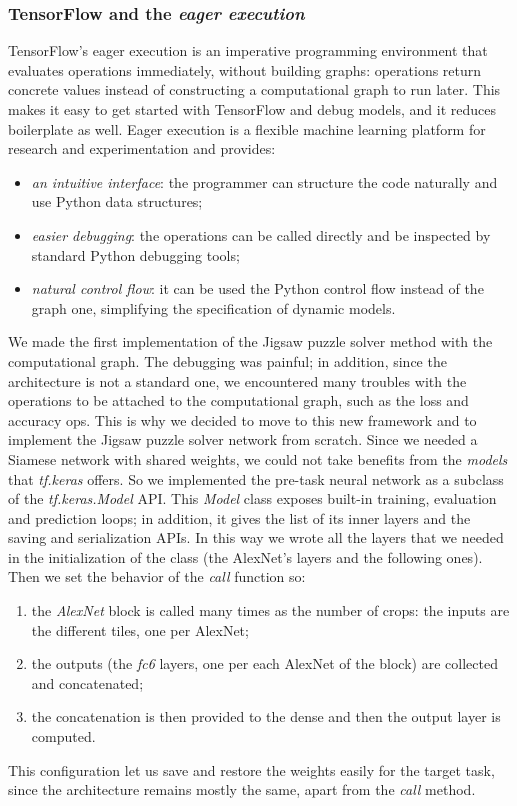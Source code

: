 \subsubsection{TensorFlow and the \emph{eager execution}}
TensorFlow's eager execution \cite{tf_eager} is an imperative programming environment that evaluates operations immediately, without building graphs: operations return concrete values instead of constructing a computational graph to run later. This makes it easy to get started with TensorFlow and debug models, and it reduces boilerplate as well. Eager execution is a flexible machine learning platform for research and experimentation and provides:
\begin{itemize}
    \item \textit{an intuitive interface}: the programmer can structure the code naturally and use Python data structures;
    \item \textit{easier debugging}: the operations can be called directly and be inspected by standard Python debugging tools;
    \item \textit{natural control flow}: it can be used the Python control flow instead of the graph one, simplifying the specification of dynamic models.
\end{itemize}
We made the first implementation of the Jigsaw puzzle solver method with the computational graph. The debugging was painful; in addition, since the architecture is not a standard one, we encountered many troubles with the operations to be attached to the computational graph, such as the loss and accuracy ops. This is why we decided to move to this new framework and to implement the Jigsaw puzzle solver network from scratch.\newline
Since we needed a Siamese network with shared weights, we could not take benefits from the \emph{models} that \emph{tf.keras} offers. So we implemented the pre-task neural network as a subclass of the \emph{tf.keras.Model} API. This \emph{Model} class exposes built-in training, evaluation and prediction loops; in addition, it gives the list of its inner layers and the saving and serialization APIs. In this way we wrote all the layers that we needed in the initialization of the class (the AlexNet's layers and the following ones). Then we set the behavior of the \emph{call} function so:
\begin{enumerate}
    \item the \emph{AlexNet} block is called many times as the number of crops: the inputs are the different tiles, one per AlexNet;
    \item the outputs (the \textit{fc6} layers, one per each AlexNet of the block) are collected and concatenated;
    \item the concatenation is then provided to the dense and then the output layer is computed.
\end{enumerate}
This configuration let us save and restore the weights easily for the target task, since the architecture remains mostly the same, apart from the \emph{call} method.

